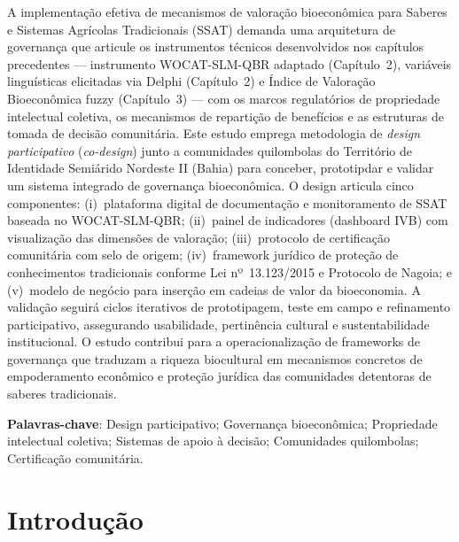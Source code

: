{\renewcommand{\PRIVATEbookmarkthis}[1]{}%
\begin{resumoumacoluna}
A implementação efetiva de mecanismos de valoração bioeconômica para Saberes e Sistemas Agrícolas Tradicionais (SSAT) demanda uma arquitetura de governança que articule os instrumentos técnicos desenvolvidos nos capítulos precedentes --- instrumento WOCAT-SLM-QBR adaptado (Capítulo~2), variáveis linguísticas elicitadas via Delphi (Capítulo~2) e Índice de Valoração Bioeconômica fuzzy (Capítulo~3) --- com os marcos regulatórios de propriedade intelectual coletiva, os mecanismos de repartição de benefícios e as estruturas de tomada de decisão comunitária. Este estudo emprega metodologia de \textit{design participativo} (\textit{co-design}) junto a comunidades quilombolas do Território de Identidade Semiárido Nordeste II (Bahia) para conceber, prototipdar e validar um sistema integrado de governança bioeconômica. O design articula cinco componentes: (i)~plataforma digital de documentação e monitoramento de SSAT baseada no WOCAT-SLM-QBR; (ii)~painel de indicadores (dashboard IVB) com visualização das dimensões de valoração; (iii)~protocolo de certificação comunitária com selo de origem; (iv)~framework jurídico de proteção de conhecimentos tradicionais conforme Lei nº~13.123/2015 e Protocolo de Nagoia; e (v)~modelo de negócio para inserção em cadeias de valor da bioeconomia. A validação seguirá ciclos iterativos de prototipagem, teste em campo e refinamento participativo, assegurando usabilidade, pertinência cultural e sustentabilidade institucional. O estudo contribui para a operacionalização de frameworks de governança que traduzam a riqueza biocultural em mecanismos concretos de empoderamento econômico e proteção jurídica das comunidades detentoras de saberes tradicionais.

\vspace{\onelineskip}
\noindent
\textbf{Palavras-chave}: Design participativo; Governança bioeconômica; Propriedade intelectual coletiva; Sistemas de apoio à decisão; Comunidades quilombolas; Certificação comunitária.
\end{resumoumacoluna}}

\newpage

\section{Introdução}


